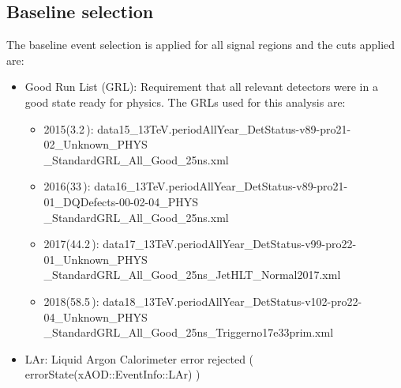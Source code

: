 \subsection{Baseline selection}
\label{sec:base_selection}
The baseline event selection is applied for all signal regions and
the cuts applied are:
\begin{itemize}
\item Good Run List (GRL): Requirement that all relevant detectors were in a good state ready for physics. The GRLs used for this analysis are:
        \begin{itemize}
                \item 2015(3.2\,\ifb): data15\_13TeV.periodAllYear\_DetStatus-v89-pro21-02\_Unknown\_PHYS\\\_StandardGRL\_All\_Good\_25ns.xml
                \item 2016(33\,\ifb): data16\_13TeV.periodAllYear\_DetStatus-v89-pro21-01\_DQDefects-00-02-04\_PHYS\\\_StandardGRL\_All\_Good\_25ns.xml
                \item 2017(44.2\,\ifb): data17\_13TeV.periodAllYear\_DetStatus-v99-pro22-01\_Unknown\_PHYS\\\_StandardGRL\_All\_Good\_25ns\_JetHLT\_Normal2017.xml
                \item 2018(58.5\,\ifb): data18\_13TeV.periodAllYear\_DetStatus-v102-pro22-04\_Unknown\_PHYS\\\_StandardGRL\_All\_Good\_25ns\_Triggerno17e33prim.xml
        \end{itemize}
\item LAr: Liquid Argon Calorimeter error rejected ( errorState(xAOD::EventInfo::LAr) )

\end{itemize}
